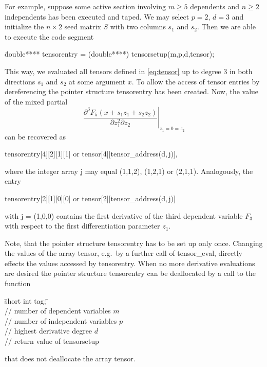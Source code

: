 \documentclass[11pt,twoside]{article}
\begin{document}
For example, suppose some active section involving  $m \geq 5$ dependents and 
$n \geq 2$ independents has been executed and taped. We may 
select $p=2$, $d=3$ and initialize the $n\times 2$ seed matrix $S$ with two 
columns $s_1$ and $s_2$. Then we are able to execute the code segment 
\begin{tabbing}
\hspace{0.5in}\={\sf double**** tensorentry = (double****) tensorsetup(m,p,d,tensor);} \\
\end{tabbing}
This way, we evaluated all tensors defined in \eqref{eq:tensor} up to degree 3
in both directions $s_1$ and 
$s_2$ at some argument $x$. To allow the access of tensor entries by dereferencing the pointer 
structure {\sf tensorentry} has been created. Now,  
the value of the mixed partial
\[
 \left. \frac{\partial ^ 3 F_5(x+s_1 z_1+s_2 z_2)}{\partial z_1^2 \partial z_2}   \right |_{z_1=0=z_2}  
\]
can be recovered as 
\begin{center}
   {\sf tensorentry[4][2][1][1]} \hspace{0.2in} or \hspace{0.2in} {\sf tensor[4][tensor\_address(d,$\,$j)]},
\end{center}
where the integer array {\sf j} may equal (1,1,2), (1,2,1) or (2,1,1).  
Analogously, the entry 
\begin{center}   
   {\sf tensorentry[2][1][0][0]} \hspace{0.2in} or \hspace{0.2in} {\sf tensor[2][tensor\_address(d,$\,$j)]}
\end{center}
with {\sf j} = (1,0,0) contains the first derivative of the third dependent
variable $F_3$ with respect to the first differentiation parameter $z_1$. 

Note, that the pointer structure {\sf tensorentry} has to be set up only once. Changing the values of the
array {\sf tensor}, e.g.~by a further call of {\sf tensor\_eval}, directly effects the values accessed
by {\sf tensorentry}.
%
When no more derivative evaluations are desired the pointer structure
{\sf tensorentry} can be deallocated by a call to the function
%
\begin{tabbing}
\hspace{0.5in}\={\sf short int tag;} \hspace{1.1in}\= \kill    %
\\
                    \> // number of dependent variables $m$ \\
                    \> // number of independent variables $p$\\
                    \> // highest derivative degree $d$\\
 \> // return value of {\sf tensorsetup}  
\end{tabbing} 
%
that does not deallocate the array {\sf tensor}.
\end{document}
